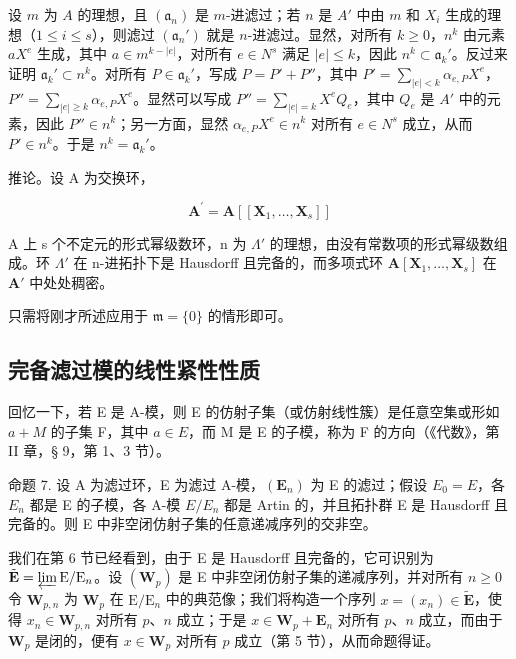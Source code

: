 	设 \(m\) 为 \(A\) 的理想，且 \((\mathfrak{a}_n)\) 是 \(m\)-进滤过；若 \(n\) 是 \(A'\) 中由 \(m\) 和 \(X_i\) 生成的理想（\(1 \leqslant i \leqslant s\)），则滤过 \((\mathfrak{a}_n')\) 就是 \(n\)-进滤过。显然，对所有 \(k \geqslant 0\)，\(n^k\) 由元素 \(aX^e\) 生成，其中 \(a \in m^{k-|e|}\)，对所有 \(e \in N^s\) 满足 \(|e| \leqslant k\)，因此 \(n^k \subset \mathfrak{a}_k'\)。反过来证明 \(\mathfrak{a}_k' \subset n^k\)。对所有 \(P \in \mathfrak{a}_k'\)，写成 \(P = P' + P''\)，其中 \(P' = \sum_{|e| < k} \alpha_{e,P} X^e\)，\(P'' = \sum_{|e| \geqslant k} \alpha_{e,P} X^e\)。显然可以写成 \(P'' = \sum_{|e|=k} X^e Q_e\)，其中 \(Q_e\) 是 \(A'\) 中的元素，因此 \(P'' \in n^k\)；另一方面，显然 \(\alpha_{e,P} X^e \in n^k\) 对所有 \(e \in N^s\) 成立，从而 \(P' \in n^k\)。于是 \(n^k = \mathfrak{a}_k'\)。

推论。设 A 为交换环，

\[
\mathbf {A} ^ {\prime} = \mathbf {A} [ [ \mathbf {X} _ {1}, \dots , \mathbf {X} _ {s} ] ]
\]

A 上 s 个不定元的形式幂级数环，n 为 \(\Lambda'\) 的理想，由没有常数项的形式幂级数组成。环 \(\Lambda'\) 在 n-进拓扑下是 Hausdorff 且完备的，而多项式环 \(\mathbf{A}[\mathbf{X}_1,\dots ,\mathbf{X}_s]\) 在 \(\mathbf{A}'\) 中处处稠密。

只需将刚才所述应用于 \(\mathfrak{m} = \{0\}\) 的情形即可。

\subsection{完备滤过模的线性紧性性质}

回忆一下，若 E 是 A-模，则 E 的仿射子集（或仿射线性簇）是任意空集或形如 \(a + M\) 的子集 F，其中 \(a \in E\)，而 M 是 E 的子模，称为 F 的方向（《代数》，第 II 章，§ 9，第 1、3 节）。

命题 7. 设 A 为滤过环，E 为滤过 A-模，\((\mathbf{E}_{n})\) 为 E 的滤过；假设 \(E_{0} = E\)，各 \(E_{n}\) 都是 E 的子模，各 A-模 \(E/E_{n}\) 都是 Artin 的，并且拓扑群 E 是 Hausdorff 且完备的。则 E 中非空闭仿射子集的任意递减序列的交非空。

	我们在第 6 节已经看到，由于 E 是 Hausdorff 且完备的，它可识别为 \(\tilde{\mathbf{E}} = \varprojlim \mathrm{E} / \mathrm{E}_n\)。设 \((\mathbf{W}_p)\) 是 E 中非空闭仿射子集的递减序列，并对所有 \(n \geqslant 0\) 令 \(\mathbf{W}_{p,n}\) 为 \(\mathbf{W}_p\) 在 \(\mathrm{E} / \mathrm{E}_n\) 中的典范像；我们将构造一个序列 \(x = (x_n) \in \tilde{\mathbf{E}}\)，使得 \(x_n \in \mathbf{W}_{p,n}\) 对所有 \(p\)、\(n\) 成立；于是 \(x \in \mathbf{W}_p + \mathbf{E}_n\) 对所有 \(p\)、\(n\) 成立，而由于 \(\mathbf{W}_p\) 是闭的，便有 \(x \in \mathbf{W}_p\) 对所有 \(p\) 成立（第 5 节），从而命题得证。

